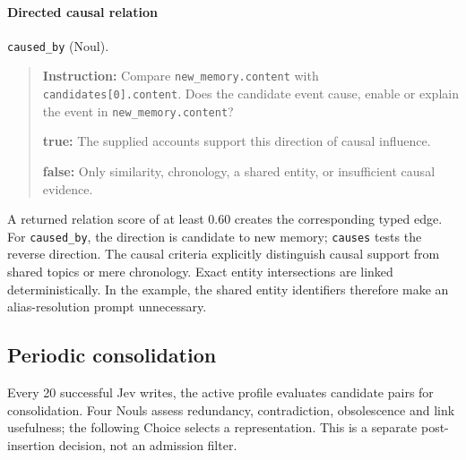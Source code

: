 \documentclass[11pt]{article}
\begin{document}
\paragraph{Directed causal relation} \texttt{caused\_by} (Noul).
\begin{quote}\small
\noindent\textbf{Instruction:} Compare \texttt{new\_memory.content} with \texttt{candidates[0].content}. Does the candidate event cause, enable or explain the event in \texttt{new\_memory.content}?\par
\noindent\textbf{true:} The supplied accounts support this direction of causal influence.\par
\noindent\textbf{false:} Only similarity, chronology, a shared entity, or insufficient causal evidence.\par
\end{quote}

A returned relation score of at least 0.60 creates the corresponding typed edge. For \texttt{caused\_by}, the direction is candidate to new memory; \texttt{causes} tests the reverse direction. The causal criteria explicitly distinguish causal support from shared topics or mere chronology. Exact entity intersections are linked deterministically. In the example, the shared entity identifiers therefore make an alias-resolution prompt unnecessary.


\subsection{Periodic consolidation}

Every 20 successful Jev writes, the active profile evaluates candidate pairs for consolidation. Four Nouls assess redundancy, contradiction, obsolescence and link usefulness; the following Choice selects a representation. This is a separate post-insertion decision, not an admission filter.
\end{document}
